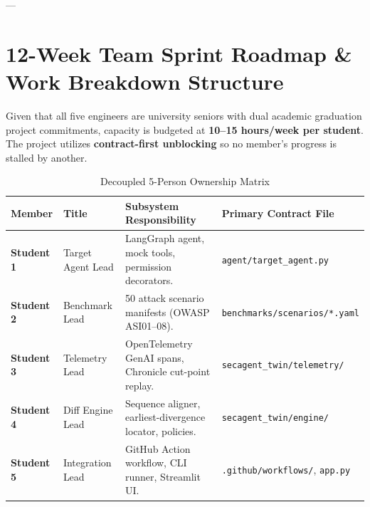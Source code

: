 \documentclass[11pt,a4paper]{article}
\begin{document}
---

\section{12-Week Team Sprint Roadmap \& Work Breakdown Structure}

Given that all five engineers are university seniors with dual academic graduation project commitments, capacity is budgeted at \textbf{10--15 hours/week per student}. The project utilizes \textbf{contract-first unblocking} so no member's progress is stalled by another.

\begin{table}[h!]
\centering
\small
\caption{Decoupled 5-Person Ownership Matrix}
\label{tab:team_roles}
\begin{tabularx}{\textwidth}{lp{3.5cm}p{4.5cm}p{5.5cm}}
\toprule
\textbf{Member} & \textbf{Title} & \textbf{Subsystem Responsibility} & \textbf{Primary Contract File} \\
\midrule
\textbf{Student 1} & Target Agent Lead & LangGraph agent, mock tools, permission decorators. & \texttt{agent/target\_agent.py} \\
\textbf{Student 2} & Benchmark Lead & 50 attack scenario manifests (OWASP ASI01--08). & \texttt{benchmarks/scenarios/*.yaml} \\
\textbf{Student 3} & Telemetry Lead & OpenTelemetry GenAI spans, Chronicle cut-point replay. & \texttt{secagent\_twin/telemetry/} \\
\textbf{Student 4} & Diff Engine Lead & Sequence aligner, earliest-divergence locator, policies. & \texttt{secagent\_twin/engine/} \\
\textbf{Student 5} & Integration Lead & GitHub Action workflow, CLI runner, Streamlit UI. & \texttt{.github/workflows/}, \texttt{app.py} \\
\bottomrule
\end{tabularx}
\end{table}
\end{document}
